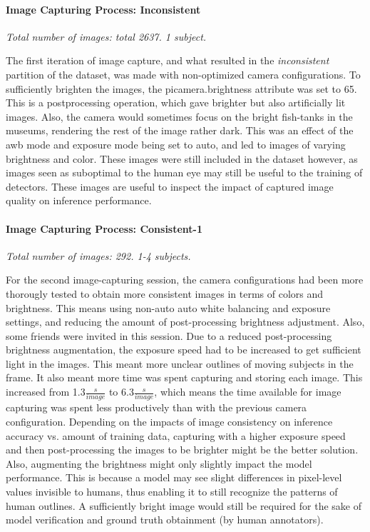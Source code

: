 \paragraph{Image Capturing Process: Inconsistent}
\textit{Total number of images: total 2637. 1 subject.}

The first iteration of image capture, and what resulted in the \textit{inconsistent} partition of the dataset, was made with non-optimized camera configurations. To sufficiently brighten the images, the picamera.brightness attribute was set to 65. This is a postprocessing operation, which gave brighter but also artificially lit images. Also, the camera would sometimes focus on the bright fish-tanks in the museums, rendering the rest of the image rather dark. This was an effect of the awb mode and exposure mode being set to auto, and led to images of varying brightness and color. These images were still included in the dataset however, as images seen as suboptimal to the human eye may still be useful to the training of detectors. These images are useful to inspect the impact of captured image quality on inference performance. 

\paragraph{Image Capturing Process: Consistent-1}
\textit{Total number of images: 292. 1-4 subjects.}

For the second image-capturing session, the camera configurations had been more thorougly tested to obtain more consistent images in terms of colors and brightness. This means using non-auto auto white balancing and exposure settings, and reducing the amount of post-processing brightness adjustment. Also, some friends were invited in this session. Due to a reduced post-processing brightness augmentation, the exposure speed had to be increased to get sufficient light in the images. This meant more unclear outlines of moving subjects in the frame. It also meant more time was spent capturing and storing each image. This increased from 1.3$\frac{s}{image}$ to 6.3$\frac{s}{image}$, which means the time available for image capturing was spent less productively than with the previous camera configuration. Depending on the impacts of image consistency on inference accuracy vs. amount of training data, capturing with a higher exposure speed and then post-processing the images to be brighter might be the better solution. Also, augmenting the brightness might only slightly impact the model performance. This is because a model may see slight differences in pixel-level values invisible to humans, thus enabling it to still recognize the patterns of human outlines. A sufficiently bright image would still be required for the sake of model verification and ground truth obtainment (by human annotators).

